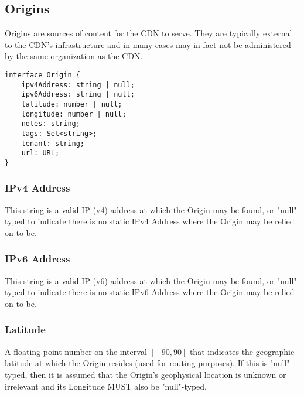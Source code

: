 %
%

\subsection{Origins}
Origins are sources of content for the CDN to serve. They are typically external
to the CDN's infrastructure and in many cases may in fact not be administered by
the same organization as the CDN.

\begin{codelisting}
\begin{verbatim}
interface Origin {
	ipv4Address: string | null;
	ipv6Address: string | null;
	latitude: number | null;
	longitude: number | null;
	notes: string;
	tags: Set<string>;
	tenant: string;
	url: URL;
}
\end{verbatim}
\end{codelisting}

\subsubsection{IPv4 Address}
This string is a valid IP (v4) address at which the Origin may be found, or
"null"-typed to indicate there is no static IPv4 Address where the Origin may be
relied on to be.

\subsubsection{IPv6 Address}
This string is a valid IP (v6) address at which the Origin may be found, or
"null"-typed to indicate there is no static IPv6 Address where the Origin may be
relied on to be.

\subsubsection{Latitude}
A floating-point number on the interval $[-90, 90]$ that indicates the
geographic latitude at which the Origin resides (used for routing purposes). If
this is "null"-typed, then it is assumed that the Origin's geophysical location
is unknown or irrelevant and its Longitude MUST also be "null"-typed.

